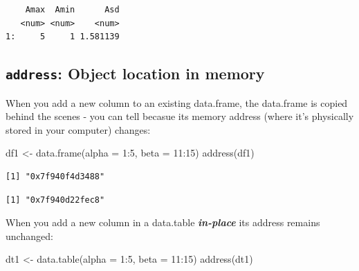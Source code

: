 \documentclass[
]{book}
\newenvironment{Shaded}{\begin{snugshade}}{\end{snugshade}}
\newcommand{\AttributeTok}[1]{\textcolor[rgb]{0.77,0.63,0.00}{#1}}
\newcommand{\DecValTok}[1]{\textcolor[rgb]{0.00,0.00,0.81}{#1}}
\newcommand{\FunctionTok}[1]{\textcolor[rgb]{0.00,0.00,0.00}{#1}}
\newcommand{\NormalTok}[1]{#1}
\newcommand{\OtherTok}[1]{\textcolor[rgb]{0.56,0.35,0.01}{#1}}
\newcommand{\SpecialCharTok}[1]{\textcolor[rgb]{0.00,0.00,0.00}{#1}}
\begin{document}
\begin{verbatim}
    Amax  Amin      Asd
   <num> <num>    <num>
1:     5     1 1.581139
\end{verbatim}

\hypertarget{address-object-location-in-memory}{%
\subsection{\texorpdfstring{\texttt{address}: Object location in memory}{address: Object location in memory}}\label{address-object-location-in-memory}}

When you add a new column to an existing data.frame, the data.frame is copied behind the scenes - you can tell becasue its memory address (where it's physically stored in your computer) changes:

\begin{Shaded}
\begin{Highlighting}[]
\NormalTok{df1 }\OtherTok{\textless{}{-}} \FunctionTok{data.frame}\NormalTok{(}\AttributeTok{alpha =} \DecValTok{1}\SpecialCharTok{:}\DecValTok{5}\NormalTok{, }\AttributeTok{beta =} \DecValTok{11}\SpecialCharTok{:}\DecValTok{15}\NormalTok{)}
\FunctionTok{address}\NormalTok{(df1)}
\end{Highlighting}
\end{Shaded}

\begin{verbatim}
[1] "0x7f940f4d3488"
\end{verbatim}

\begin{Shaded}
\end{Shaded}

\begin{verbatim}
[1] "0x7f940d22fec8"
\end{verbatim}

When you add a new column in a data.table \textbf{\emph{in-place}} its address remains unchanged:

\begin{Shaded}
\begin{Highlighting}[]
\NormalTok{dt1 }\OtherTok{\textless{}{-}} \FunctionTok{data.table}\NormalTok{(}\AttributeTok{alpha =} \DecValTok{1}\SpecialCharTok{:}\DecValTok{5}\NormalTok{, }\AttributeTok{beta =} \DecValTok{11}\SpecialCharTok{:}\DecValTok{15}\NormalTok{)}
\FunctionTok{address}\NormalTok{(dt1)}
\end{Highlighting}
\end{Shaded}
\end{document}
